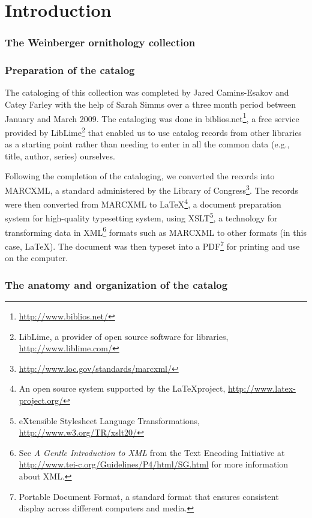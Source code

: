 \chapter*{Introduction}

\subsection*{The Weinberger ornithology collection}

\subsection*{Preparation of the catalog}

The cataloging of this collection was completed by Jared Camins-Esakov and Catey
Farley with the help of Sarah Simms over a three month period between January
and March 2009. The cataloging was done in
{\ddag}biblios.net\footnote{\url{http://www.biblios.net/}}, a free service provided
by LibLime\footnote{LibLime, a provider of open source software for libraries,
\url{http://www.liblime.com/}} that enabled us to use catalog records from other
libraries as a starting point rather than needing to enter in all the common
data (e.g., title, author, series) ourselves.

Following the completion of the cataloging, we converted the records into MARCXML,
a standard administered by the Library of
Congress\footnote{\url{http://www.loc.gov/standards/marcxml/}}. The records were
then converted from MARCXML to \LaTeX\footnote{An open source system supported by
the \LaTeX project, \url{http://www.latex-project.org/}}, a document preparation
system for high-quality typesetting system, using XSLT\footnote{eXtensible
Stylesheet Language Transformations, \url{http://www.w3.org/TR/xslt20/}}, a
technology for transforming data in XML\footnote{See \emph{A Gentle Introduction
to XML} from the Text Encoding Initiative at
\url{http://www.tei-c.org/Guidelines/P4/html/SG.html} for more information about
XML.} formats such as MARCXML to other formats (in this case, \LaTeX). The document
was then typeset into a PDF\footnote{Portable Document Format, a standard format
that ensures consistent display across different computers and media.} for printing
and use on the computer.

\subsection*{The anatomy and organization of the catalog}

